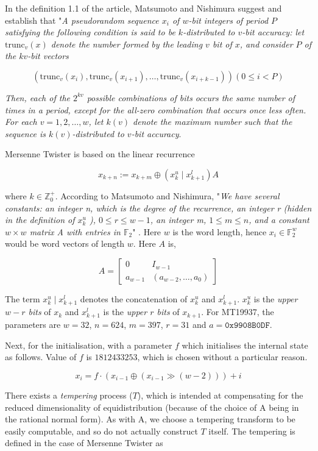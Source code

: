 In the definition 1.1 of the article, Matsumoto and Nishimura suggest and establish that "\textit{A pseudorandom sequence $x_i$ of $w$-bit integers of period $P$ satisfying the following condition is said to be $k$-distributed to $v$-bit accuracy: let $\text{trunc}_v(x)$ denote the number formed by the leading $v$ bit of $x$, and consider $P$ of the $kv$-bit vectors}

\[
	(\text{trunc}_v(x_i), \text{trunc}_v(x_{i+1}), \ldots, \text{trunc}_v(x_{i+k-1})) (0 \leq i < P)
\]

\textit{Then, each of the $2^{kv}$ possible combinations of bits occurs the same number of times in a period, except for the all-zero combination that occurs once less often. For each $v = 1, 2, \ldots, w$, let $k(v)$ denote the maximum number such that the sequence is $k(v)$-distributed to $v$-bit accuracy}\cite{art_mt_tomacs_urng}.

Mersenne Twister is based on the linear recurrence

\[
    x_{k+n}:=x_{k+m} \oplus (x^u_k \mid x^l_{k+1})A
\]

where $k \in \mathbb{Z}^+_0$. According to Matsumoto and Nishimura, "\textit{We have several constants: an integer n, which is the degree of the recurrence, an integer r (hidden in the definition of $x_k^u$ ), $0 \leq r \leq w - 1$, an integer m, $1 \leq m \leq n$, and a constant $w \times w$ matrix A with entries in $\mathbb{F}_2$}" \cite{art_mt_tomacs_urng}. Here $w$ is the word length, hence $x_i \in \mathbb{F}_2^w$ would be word vectors of length $w$. Here $A$ is,

\[ 
    A = \begin{bmatrix}
      0 & I_{w-1} \\
      a_{w-1} & (a_{w-2}, \ldots, a_0)
      \end{bmatrix}
\]

The term $x^u_k \mid x^l_{k+1}$ denotes the concatenation of $x^u_k$ and $x^l_{k+1}$. $x^u_k$ is the \textit{upper $w-r$ bits} of $x_k$ and $x^l_{k+1}$ is the \textit{upper $r$ bits} of $x_{k+1}$. For MT19937, the parameters are $w = 32$, $n = 624$, $m = 397$, $r = 31$ and $a = \mathtt{0x9908B0DF}$.

Next, for the initialisation, with a parameter $f$ which initialises the internal state as follows. Value of $f$ is $1812433253$, which is chosen without a particular reason\cite{rep_cryptmt}.

\[
    x_i = f \cdot (x_{i−1} \oplus (x_{i−1} \gg (w−2))) + i
\]

There exists a \textit{tempering} process ($T$), which is intended at compensating for the reduced dimensionality of equidistribution (because of the choice of A being in the rational normal form). As with A, we choose a tempering transform to be easily computable, and so do not actually construct $T$ itself. The tempering is defined in the case of Mersenne Twister as

